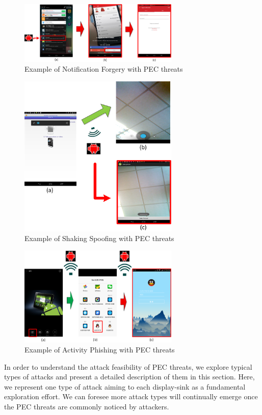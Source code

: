 \begin{figure}
\centering
\includegraphics[width = 3.0in]{pic3.png}
\caption{\label{}Example of Notification Forgery with PEC threats}
\end{figure}

\begin{figure}
\centering
\includegraphics[width = 3.0in]{pic4.png}
\caption{\label{}Example of Shaking Spoofing with PEC threats}
\end{figure}

\begin{figure}
\centering
\includegraphics[width = 3.0in]{pic5.png}
\caption{\label{}Example of Activity Phishing with PEC threats}
\end{figure}

In order to understand the attack feasibility of PEC threats, we explore typical types of attacks and present a detailed description of them in this section. Here, we represent one type of attack aiming to each display-sink as a fundamental exploration effort. We can foresee more attack types will continually emerge once the PEC threats are commonly noticed by attackers. 

